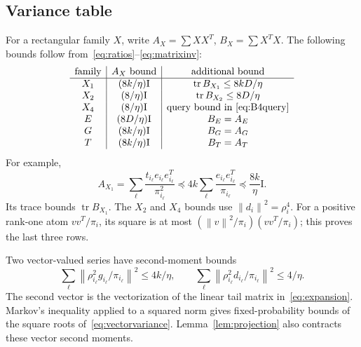 \documentclass[11pt]{article}
\theoremstyle{remark}\newtheorem{remark}[theorem]{Remark}
\newcommand{\Tr}{\operatorname{tr}}\newcommand{\rank}{\operatorname{rank}}
\newcommand{\norm}[1]{\left\lVert#1\right\rVert}\newcommand{\abs}[1]{\left|#1\right|}
\newcommand{\Id}{\mathrm I}\newcommand{\dbar}{\bar d}
\numberwithin{equation}{section}
\begin{document}
\subsection{Variance table}
For a rectangular family $X$, write $A_X=\sum XX^T$, $B_X=\sum X^TX$. The following bounds follow from~\eqref{eq:ratios}--\eqref{eq:matrixinv}:
\begin{equation}\label{eq:variance-table}
\begin{array}{c|c|c}
\text{family}&A_X\text{ bound}&\text{additional bound}\\\hline
X_1&(8k/\eta)\Id&\Tr B_{X_1}\le8kD/\eta\\
X_2&(8/\eta)\Id&\Tr B_{X_2}\le8D/\eta\\
X_4&(8/\eta)\Id&\text{query bound in \eqref{eq:B4query}}\\
E&(8D/\eta)\Id&B_E=A_E\\
G&(8k/\eta)\Id&B_G=A_G\\
T&(8k/\eta)\Id&B_T=A_T
\end{array}
\end{equation}
For example,
\[
 A_{X_1}=\sum_\ell\frac{t_{i_\ell}e_{i_\ell}e_{i_\ell}^T}{\pi_{i_\ell}^2}
 \preceq4k\sum_\ell\frac{e_{i_\ell}e_{i_\ell}^T}{\pi_{i_\ell}}
 \preceq\frac{8k}{\eta}\Id.
\]
Its trace bounds $\Tr B_{X_1}$. The $X_2$ and $X_4$ bounds use $\norm{d_i}^2=\rho_i^4$. For a positive rank-one atom $vv^T/\pi_i$, its square is at most $(\norm v^2/\pi_i)(vv^T/\pi_i)$; this proves the last three rows.

Two vector-valued series have second-moment bounds
\begin{equation}\label{eq:vectorvariance}
 \sum_\ell\norm{\rho_{i_\ell}^2g_{i_\ell}/\pi_{i_\ell}}^2\le4k/\eta,
 \qquad
 \sum_\ell\norm{\rho_{i_\ell}^2d_{i_\ell}/\pi_{i_\ell}}^2\le4/\eta.
\end{equation}
The second vector is the vectorization of the linear tail matrix in~\eqref{eq:expansion}. Markov's inequality applied to a squared norm gives fixed-probability bounds of the square roots of~\eqref{eq:vectorvariance}. Lemma~\ref{lem:projection} also contracts these vector second moments.
\end{document}
